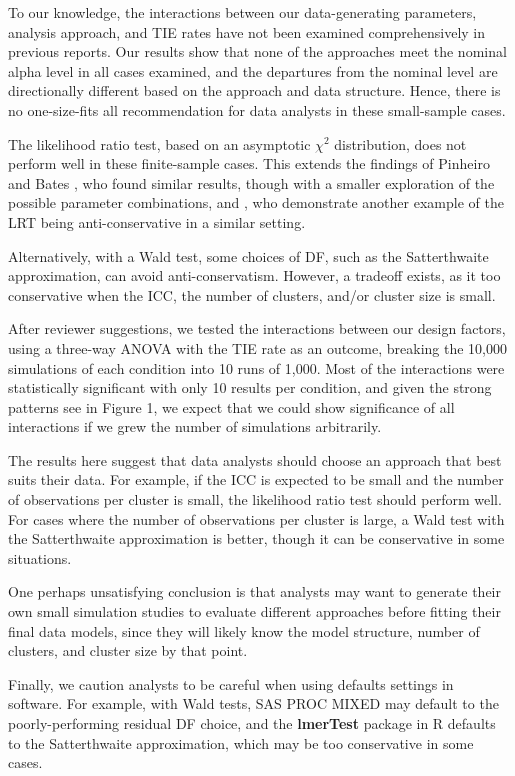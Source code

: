 \documentclass[twocolumn]{bmcart}%
\begin{document}
To our knowledge, the interactions between our data-generating parameters, analysis approach, and TIE rates have not been examined comprehensively in previous reports. Our results show that none of the approaches meet the nominal alpha level in all cases examined, and the departures from the nominal level are directionally different based on the approach and data structure. Hence, there is no one-size-fits all recommendation for data analysts in these small-sample cases.

The likelihood ratio test, based on an asymptotic $\chi^2$ distribution, does not perform well in these finite-sample cases. This extends the findings of Pinheiro and Bates \cite{pinheiro_mixed-effects_2009}, who found similar results, though with a smaller exploration of the possible parameter combinations, and \cite{halekoh_kenward-roger_2014}, who demonstrate another example of the LRT being anti-conservative in a similar setting.

Alternatively, with a Wald test, some choices of DF, such as the Satterthwaite approximation, can avoid anti-conservatism. However, a tradeoff exists, as it too conservative when the ICC, the number of clusters, and/or cluster size is small. 

After reviewer suggestions, we tested the interactions between our design factors, using a three-way ANOVA with the TIE rate as an outcome, breaking the 10,000 simulations of each condition into 10 runs of 1,000. Most of the interactions were statistically significant with only 10 results per condition, and given the strong patterns see in Figure 1, we expect that we could show significance of all interactions if we grew the number of simulations arbitrarily.

The results here suggest that data analysts should choose an approach that best suits their data. For example, if the ICC is expected to be small and the number of observations per cluster is small, the likelihood ratio test should perform well. For cases where the number of observations per cluster is large, a Wald test with the Satterthwaite approximation is better, though it can be conservative in some situations.

One perhaps unsatisfying conclusion is that analysts may want to generate their own small simulation studies to evaluate different approaches before fitting their final data models, since they will likely know the model structure, number of clusters, and cluster size by that point.

Finally, we caution analysts to be careful when using defaults settings in software. For example, with Wald tests, SAS PROC MIXED may default to the poorly-performing residual DF choice, and the \textbf{lmerTest} package in R defaults to the Satterthwaite approximation, which may be too conservative in some cases.
\end{document}
